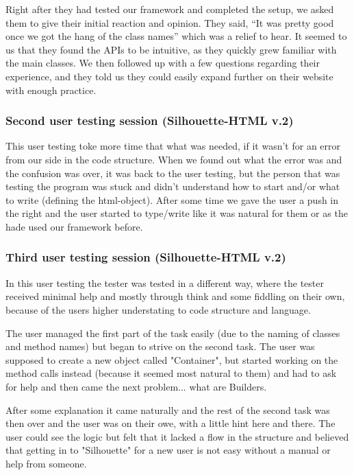 \documentclass[12pt]{article}
\begin{document}
        Right after they had tested our framework and completed the setup, we asked them to give their initial reaction and opinion. They said, “It was pretty good once we got the hang of the class names” which was a relief to hear. It seemed to us that they found the APIs to be intuitive, as they quickly grew familiar with the main classes. We then followed up with a few questions regarding their experience, and they told us they could easily expand further on their website with enough practice.

        \subsubsection{Second user testing session (Silhouette-HTML v.2)}

        This user testing toke more time that what was needed, if it wasn’t for an error from our side in the code structure. When we found out what the error was and the confusion was over, it was back to the user testing, but the person that was testing the program was stuck and didn’t understand how to start and/or what to write (defining the html-object). After some time we gave the user a push in the right and the user started to type/write like it was natural for them or as the hade used our framework before.

        \subsubsection{Third user testing session (Silhouette-HTML v.2)}

        In this user testing the tester was tested in a different way, where the tester received minimal help and mostly through think and some fiddling on their own, because of the users higher understating to code structure and language.

        The user managed the first part of the task easily (due to the naming of classes and method names) but began to strive on the second task. The user was supposed to create a new object called "Container", but started working on the method calls instead (because it seemed most natural to them) and had to ask for help and then came the next problem... what are Builders.

        After some explanation it came naturally and the rest of the second task was then over and the user was on their owe, with a little hint here and there. The user could see the logic but felt that it lacked a flow in the structure and believed that getting in to "Silhouette" for a new user is not easy without a manual or help from someone.
        
\end{document}
